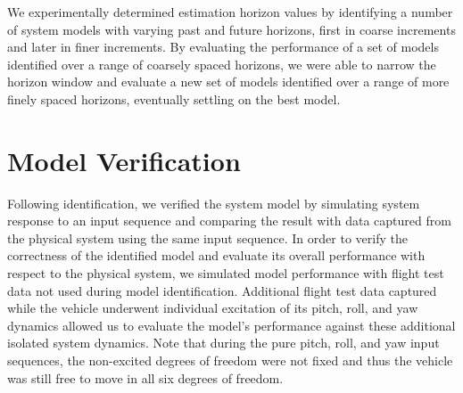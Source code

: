 We experimentally determined estimation horizon values by identifying a number of system models with varying past and future horizons, first in coarse increments and later in finer increments. By evaluating the performance of a set of models identified over a range of coarsely spaced horizons, we were able to narrow the horizon window and evaluate a new set of models identified  over a range of more finely spaced horizons, eventually settling on the best model. 


\section{Model Verification}
Following identification, we verified the system model by simulating system response to an input sequence and comparing the result with data captured from the physical system using the same input sequence. In order to verify the correctness of the identified model and evaluate its overall performance with respect to the physical system, we simulated model performance with flight test data not used during model identification. Additional flight test data captured while the vehicle underwent individual excitation of its pitch, roll, and yaw dynamics allowed us to evaluate the model's performance against these additional isolated system dynamics. Note that during the pure pitch, roll, and yaw input sequences, the non-excited degrees of freedom were not fixed and thus the vehicle was still free to move in all six degrees of freedom.
























